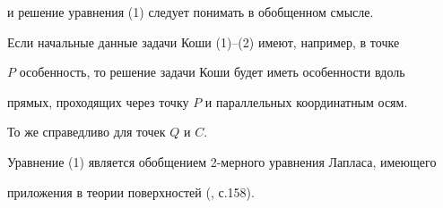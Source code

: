 и решение уравнения (1) следует понимать в обобщенном смысле.





Если начальные данные задачи Коши (1)--(2) имеют, например, в точке


$P$ особенность, то решение задачи Коши будет иметь особенности вдоль


прямых, проходящих через точку $P$ и параллельных координатным осям.


То же справедливо для точек $Q$ и $C$.





Уравнение (1) является обобщением 2-мерного уравнения Лапласа, имеющего


приложения в теории поверхностей (\cite{Mu}, с.158).





